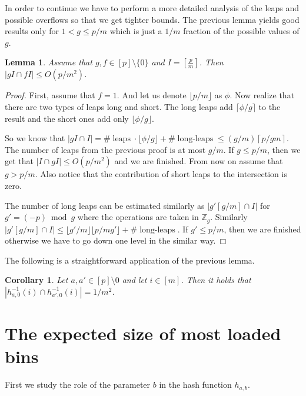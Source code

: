 \documentclass{article}
\newtheorem{lemma}{Lemma}
\newtheorem{corollary}{Corollary}
\begin{document}
In order to continue we have to perform a more detailed analysis of the leaps and possible overflows so that we get tighter bounds.
The previous lemma yields good results only for $1 < g \leq p/m$ which is just a $1/m$ fraction of the possible values of $g$.

\begin{lemma}
Assume that $g, f \in [p] \setminus \{0\}$ and $I = \left[\frac{p}{m}\right]$. Then $|gI \cap fI| \leq O(p/m^2)$.
\end{lemma}
\begin{proof}
First, assume that $f = 1$. And let us denote $\lfloor p/m \rfloor$ as $\phi$.
Now realize that there are two types of leaps long and short. The long leaps add $\lceil \phi / g \rceil$ to the result and the short ones add only $\lfloor \phi / g \rfloor$.

So we know that $|gI \cap I| = \#\operatorname{leaps} \cdot \lfloor \phi / g \rfloor + \#\operatorname{long-leaps} \leq (g/m) \left\lceil p/gm  \right\rceil.$ The number of leaps from the previous proof is at most $g/m$. If $g \leq p/m$, then we get that $|I \cap gI| \leq O(p/m^2)$ and we are finished. From now on assume that $g > p/m$. Also notice that the contribution of short leaps to the intersection is zero.

The number of long leaps can be estimated similarly as $|g'[g/m] \cap I|$ for $g' = (-p) \bmod g$ where the operations are taken in $\mathbb{Z}_g$.
Similarly $|g'[g/m] \cap I| \leq \lfloor g'/m \rfloor \lfloor p/mg' \rfloor + \#\operatorname{long-leaps}$. If $g' \leq p/m$, then we are finished otherwise we have to go down one level in the similar way.
\end{proof}

The following is a straightforward application of the previous lemma.
\begin{corollary}
Let $a, a' \in [p] \setminus {0}$ and let $i \in [m]$. Then it holds that $|h_{a, 0}^{-1}(i) \cap h_{a', 0}^{-1}(i)| = 1/m^2$.
\end{corollary}

\section{The expected size of most loaded bins}

First we study the role of the parameter $b$ in the hash function $h_{a, b}$.
\end{document}
